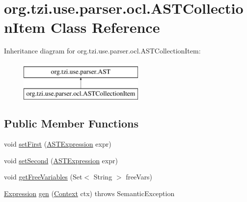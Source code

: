 \hypertarget{classorg_1_1tzi_1_1use_1_1parser_1_1ocl_1_1_a_s_t_collection_item}{\section{org.\-tzi.\-use.\-parser.\-ocl.\-A\-S\-T\-Collection\-Item Class Reference}
\label{classorg_1_1tzi_1_1use_1_1parser_1_1ocl_1_1_a_s_t_collection_item}
}
Inheritance diagram for org.\-tzi.\-use.\-parser.\-ocl.\-A\-S\-T\-Collection\-Item\-:\begin{figure}[H]
\begin{center}
\leavevmode
\includegraphics[height=2.000000cm]{classorg_1_1tzi_1_1use_1_1parser_1_1ocl_1_1_a_s_t_collection_item}
\end{center}
\end{figure}
\subsection*{Public Member Functions}
\begin{DoxyCompactItemize}
\item 
void \hyperlink{classorg_1_1tzi_1_1use_1_1parser_1_1ocl_1_1_a_s_t_collection_item_ab161040b46627c37c49ef2b615c6a318}{set\-First} (\hyperlink{classorg_1_1tzi_1_1use_1_1parser_1_1ocl_1_1_a_s_t_expression}{A\-S\-T\-Expression} expr)
\item 
void \hyperlink{classorg_1_1tzi_1_1use_1_1parser_1_1ocl_1_1_a_s_t_collection_item_acff4d67edb731c15b3f5e34c6edbc82b}{set\-Second} (\hyperlink{classorg_1_1tzi_1_1use_1_1parser_1_1ocl_1_1_a_s_t_expression}{A\-S\-T\-Expression} expr)
\item 
void \hyperlink{classorg_1_1tzi_1_1use_1_1parser_1_1ocl_1_1_a_s_t_collection_item_a3e0be1b95a86eaee9657b8092965ae62}{get\-Free\-Variables} (Set$<$ String $>$ free\-Vars)
\item 
\hyperlink{classorg_1_1tzi_1_1use_1_1uml_1_1ocl_1_1expr_1_1_expression}{Expression} \hyperlink{classorg_1_1tzi_1_1use_1_1parser_1_1ocl_1_1_a_s_t_collection_item_aaa82db99510dd42938dba4628630b709}{gen} (\hyperlink{classorg_1_1tzi_1_1use_1_1parser_1_1_context}{Context} ctx)  throws Semantic\-Exception 
\end{DoxyCompactItemize}


